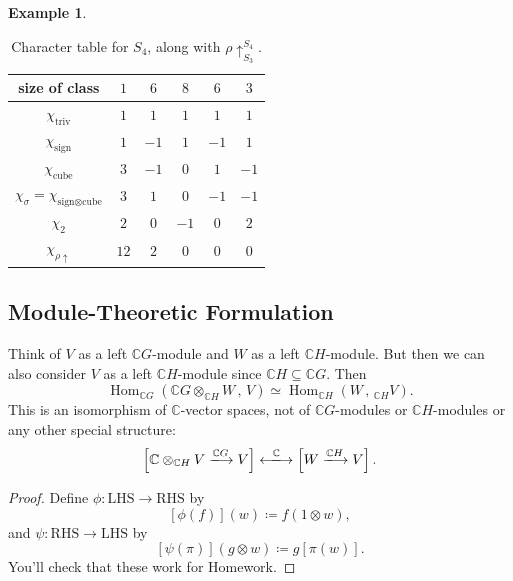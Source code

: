 \documentclass[12pt]{article}
\newcommand{\cx}{\mathbb{C}}
\theoremstyle{definition}
\newtheorem{example}{Example}[section]
\DeclareMathOperator\Hom{Hom}
\begin{document}
\begin{example}
\begin{itemize}
\begin{table}[H]
\begin{tabular}{|| c | c | c | c | c | c ||}
                size of class & $1$ & $6$ & $8$ & $6$ & $3$ \\
                \hline
                $\chi_{\text{triv}}$ & $1$ & $1$ & $1$ & $1$ & $1$ \\
                $\chi_{\text{sign}}$ & $1$ & $-1$ & $1$ & $-1$ & $1$ \\
                $\chi_{\text{cube}}$ & $3$ & $-1$ & $0$ & $1$ & $-1$ \\
                $\chi_{\sigma} = \chi_{\text{sign} \otimes \text{cube}}$ & $3$ & $1$ & $0$ & $-1$ & $-1$ \\
                $\chi_2$ & $2$ & $0$ & $-1$ & $0$ & $2$ \\
                \hline
                $\chi_{\rho \uparrow}$ & $12$ & $2$ & $0$ & $0$ & $0$ \\
                \hline
            \end{tabular}
            \caption{Character table for $S_4$, along with $\rho \uparrow_{S_3}^{S_4}$.}
            \label{tab:Table10}
        \end{table}
    \end{itemize}
\end{example}
\subsection{Module-Theoretic Formulation}
Think of $V$ as a left $\cx G$-module and $W$ as a left $\cx H$-module. But then we can also consider $V$ as a left $\cx H$-module since $\cx H \subseteq \cx G$. Then 
\begin{equation}
    \Hom_{\cx G} \left( \cx G \otimes_{\cx H} W \, , \, V \right) \simeq \Hom_{\cx H} \left( W \, , \,  _{\cx H} V \right).
\end{equation}
This is an isomorphism of $\cx$-vector spaces, not of $\cx G$-modules or $\cx H$-modules or any other special structure:
\begin{equation}
    \left[ \cx \otimes_{\cx H} V \xlongrightarrow{\cx G} V \right] \xlongleftrightarrow{\cx} \left[ W \xlongrightarrow{\cx H} V \right].
\end{equation}
\begin{proof}
    Define $\phi : \mathrm{LHS} \to \mathrm{RHS}$ by 
    \begin{equation}
        \left[ \phi(f) \right](w) \coloneqq  f(1 \otimes w),
    \end{equation}
    and $\psi : \mathrm{RHS} \to \mathrm{LHS}$ by 
    \begin{equation}
        \left[ \psi(\pi) \right](g \otimes w) \coloneqq  g \left[ \pi(w) \right].
    \end{equation}
    You'll check that these work for Homework.
\end{proof}
\end{document}
